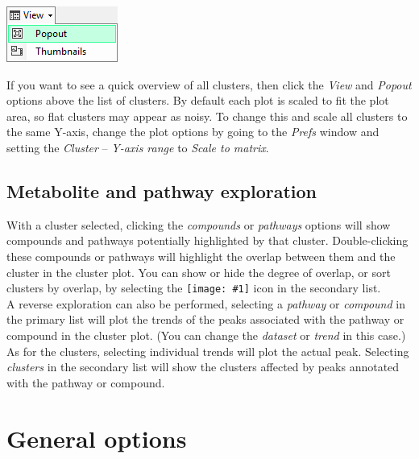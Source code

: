 \documentclass[11pt,a4paper]{article}
\newcommand{\menu}[1]{ \flqq\textit{#1}\frqq}
\newcommand{\icon}[1]{\texttt{[image: \#1]}}
\begin{document}
\begin{center}
\includegraphics{Images/userguide/popout}
\end{center}
If you want to see a quick overview of all clusters, then click the \menu{View} and \menu{Popout} options above the list of clusters. By default each plot is scaled to fit the plot area, so flat clusters may appear as noisy. To change this and scale all clusters to the same Y-axis, change the plot options by going to the \menu{Prefs} window and setting the \menu{Cluster} -- \menu{Y-axis range} to \menu{Scale to matrix}.

\subsection{Metabolite and pathway exploration}
With a cluster selected, clicking the \menu{compounds} or \menu{pathways} options will show compounds and pathways potentially highlighted by that cluster. Double-clicking these compounds or pathways will highlight the overlap between them and the cluster in the cluster plot. You can show or hide the degree of overlap, or sort clusters by overlap, by selecting the \icon{columns} icon in the secondary list.\\
A reverse exploration can also be performed, selecting a \menu{pathway} or \menu{compound} in the primary list will plot the trends of the peaks associated with the pathway or compound in the cluster plot. (You can change the \menu{dataset} or \menu{trend} in this case.) As for the clusters, selecting individual trends will plot the actual peak. Selecting \menu{clusters} in the secondary list will show the clusters affected by peaks annotated with the pathway or compound.

\section{General options}
\end{document}
